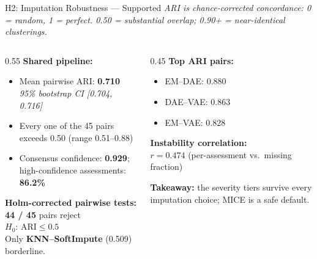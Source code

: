 \documentclass[aspectratio=169, 11pt]{beamer}
\begin{document}
\begin{frame}{H2: Imputation Robustness --- \textcolor{green!60!black}{Supported}}
  \scriptsize \textit{ARI is chance-corrected concordance: 0 = random, 1 = perfect. 0.50 = substantial overlap; 0.90+ = near-identical clusterings.}\\[0.3em]
  \begin{columns}[T]
    \begin{column}{0.55\textwidth}
      \textbf{Shared pipeline:}
      \begin{itemize}
        \item Mean pairwise ARI: \textbf{0.710} \\
              \quad \textit{95\% bootstrap CI [0.704, 0.716]}
        \item Every one of the 45 pairs exceeds 0.50 (range 0.51--0.88)
        \item Consensus confidence: \textbf{0.929}; high-confidence assessments: \textbf{86.2\%}
      \end{itemize}

      \vspace{0.5em}
      \textbf{Holm-corrected pairwise tests:}\\
      \textbf{44 / 45} pairs reject $H_0{:}\,\text{ARI}\!\le\!0.5$\\
      Only \textbf{KNN--SoftImpute} (0.509) borderline.
    \end{column}
    \begin{column}{0.45\textwidth}
      \textbf{Top ARI pairs:}
      \begin{itemize}
        \item EM--DAE: 0.880
        \item DAE--VAE: 0.863
        \item EM--VAE: 0.828
      \end{itemize}

      \vspace{0.5em}
      \textbf{Instability correlation:}\\
      $r = 0.474$ (per-assessment vs.\ missing fraction)

      \vspace{0.3em}
      \textbf{Takeaway:} the severity tiers survive every imputation choice; MICE is a safe default.
    \end{column}
  \end{columns}
\end{frame}
\end{document}
